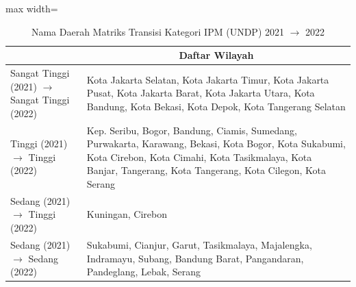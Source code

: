 \begin{table}[H]
\centering
\caption{Nama Daerah Matriks Transisi Kategori IPM (UNDP) 2021 \(\rightarrow\) 2022} \label{tab:app2ipmname2021x2022}
\begin{adjustbox}{max width=\textwidth}
\begin{tabular}{|>{\centering\arraybackslash}p{4cm}|p{10cm}|}
\hline
\multicolumn{1}{|c|}{\textbf{Kategori}} & \multicolumn{1}{c|}{\textbf{Daftar Wilayah}} \\
\hline
Sangat Tinggi (2021) \(\rightarrow\) Sangat Tinggi (2022) & Kota Jakarta Selatan, Kota Jakarta Timur, Kota Jakarta Pusat, Kota Jakarta Barat, Kota Jakarta Utara, Kota Bandung, Kota Bekasi, Kota Depok, Kota Tangerang Selatan \\
\hline
Tinggi (2021) \(\rightarrow\) Tinggi (2022) & Kep. Seribu, Bogor, Bandung, Ciamis, Sumedang, Purwakarta, Karawang, Bekasi, Kota Bogor, Kota Sukabumi, Kota Cirebon, Kota Cimahi, Kota Tasikmalaya, Kota Banjar, Tangerang, Kota Tangerang, Kota Cilegon, Kota Serang \\
\hline
Sedang (2021) \(\rightarrow\) Tinggi (2022) & Kuningan, Cirebon \\
\hline
Sedang (2021) \(\rightarrow\) Sedang (2022) & Sukabumi, Cianjur, Garut, Tasikmalaya, Majalengka, Indramayu, Subang, Bandung Barat, Pangandaran, Pandeglang, Lebak, Serang \\
\hline
\end{tabular}
\end{adjustbox}
\end{table}